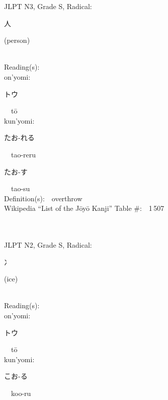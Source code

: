 \begin{multicols}{2}
{JLPT N3, Grade S, Radical:\ \ {\begin{CJK}{UTF8}{min} 人 \end{CJK}} (person) } \\
Reading(s):\ \ \\
{\hspace*{1em}}on'yomi:\ \ \\
{\hspace*{2em}}{\begin{CJK}{UTF8}{min} トウ \end{CJK}}\ \ t\=o\ \ \\
{\hspace*{1em}}kun'yomi:\ \ \\
{\hspace*{2em}}{\begin{CJK}{UTF8}{min} たお-れる \end{CJK}}\ \ tao-reru\ \ \\
{\hspace*{2em}}{\begin{CJK}{UTF8}{min} たお-す \end{CJK}}\ \ tao-su\ \ \\
Definition(s):\ \ overthrow \\
Wikipedia ``List of the J\=oy\=o Kanji'' Table \#:\ \ 1\,507 \\
\ \ \\
{\fontsize{34pt}{40pt}  }\ \ \\  %
{JLPT N2, Grade S, Radical:\ \ {\begin{CJK}{UTF8}{min} 冫 \end{CJK}} (ice) } \\
Reading(s):\ \ \\
{\hspace*{1em}}on'yomi:\ \ \\
{\hspace*{2em}}{\begin{CJK}{UTF8}{min} トウ \end{CJK}}\ \ t\=o\ \ \\
{\hspace*{1em}}kun'yomi:\ \ \\
{\hspace*{2em}}{\begin{CJK}{UTF8}{min} こお-る \end{CJK}}\ \ koo-ru\ \ \\

\end{multicols}

